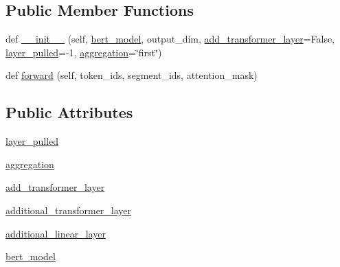 \subsection*{Public Member Functions}
\begin{DoxyCompactItemize}
\item 
def \hyperlink{classparlai_1_1agents_1_1bert__ranker_1_1helpers_1_1BertWrapper_ad21b2bd2d710a64477265cf882f6c79a}{\+\_\+\+\_\+init\+\_\+\+\_\+} (self, \hyperlink{classparlai_1_1agents_1_1bert__ranker_1_1helpers_1_1BertWrapper_a0a706d97aa94500a65154f1ce58c598b}{bert\+\_\+model}, output\+\_\+dim, \hyperlink{classparlai_1_1agents_1_1bert__ranker_1_1helpers_1_1BertWrapper_ae1ec954dac72452d7b156a15f488c024}{add\+\_\+transformer\+\_\+layer}=False, \hyperlink{classparlai_1_1agents_1_1bert__ranker_1_1helpers_1_1BertWrapper_a9223033165d667d6449fdc463d268fe4}{layer\+\_\+pulled}=-\/1, \hyperlink{classparlai_1_1agents_1_1bert__ranker_1_1helpers_1_1BertWrapper_a8943b309044ab440e4ff53e8a1f7e404}{aggregation}=\char`\"{}first\char`\"{})
\item 
def \hyperlink{classparlai_1_1agents_1_1bert__ranker_1_1helpers_1_1BertWrapper_a29a138ccda9ff978a641e5f6e0949009}{forward} (self, token\+\_\+ids, segment\+\_\+ids, attention\+\_\+mask)
\end{DoxyCompactItemize}
\subsection*{Public Attributes}
\begin{DoxyCompactItemize}
\item 
\hyperlink{classparlai_1_1agents_1_1bert__ranker_1_1helpers_1_1BertWrapper_a9223033165d667d6449fdc463d268fe4}{layer\+\_\+pulled}
\item 
\hyperlink{classparlai_1_1agents_1_1bert__ranker_1_1helpers_1_1BertWrapper_a8943b309044ab440e4ff53e8a1f7e404}{aggregation}
\item 
\hyperlink{classparlai_1_1agents_1_1bert__ranker_1_1helpers_1_1BertWrapper_ae1ec954dac72452d7b156a15f488c024}{add\+\_\+transformer\+\_\+layer}
\item 
\hyperlink{classparlai_1_1agents_1_1bert__ranker_1_1helpers_1_1BertWrapper_ac94b4da508521ec992bfe9a5f43fd339}{additional\+\_\+transformer\+\_\+layer}
\item 
\hyperlink{classparlai_1_1agents_1_1bert__ranker_1_1helpers_1_1BertWrapper_a9c1172be102ac64b708d99aaff6bd442}{additional\+\_\+linear\+\_\+layer}
\item 
\hyperlink{classparlai_1_1agents_1_1bert__ranker_1_1helpers_1_1BertWrapper_a0a706d97aa94500a65154f1ce58c598b}{bert\+\_\+model}
\end{DoxyCompactItemize}


